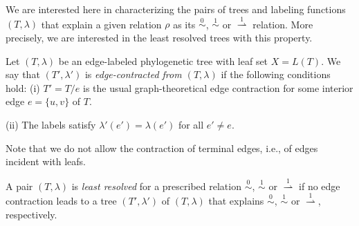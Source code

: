 \documentclass[smallextended]{svjour3}
\newcommand{\Ro}{\mathrel{\overset{0}{\sim}}}
\newcommand{\Rl}{\mathrel{\overset{1}{\sim}}}
\newcommand{\Rld}{\mathrel{\overset{1}{\rightharpoonup}}}
\begin{document}
We are interested here in characterizing the pairs of trees and labeling
functions $(T,\lambda)$ that explain a given relation $\rho$ as its $\Ro$,
$\Rl$ or $\Rld$ relation. More precisely, we are interested in the least
resolved trees with this property.

\begin{definition} 
  Let $(T,\lambda)$ be an edge-labeled phylogenetic tree with leaf set
  $X=L(T)$. We say that $(T',\lambda')$ is \emph{edge-contracted from
  $(T,\lambda)$} if the following conditions hold: (i) $T'=T/e$ is the
  usual graph-theoretical edge contraction for some interior edge
  $e=\{u,v\}$ of $T$.
  
  \noindent (ii) The labels satisfy $\lambda'(e')=\lambda(e')$ for
  all $e'\ne e$.
\end{definition} 
Note that we do not allow the contraction of terminal edges, i.e., of edges
incident with leafs. 

\begin{definition}
  A pair $(T,\lambda)$ is \emph{least resolved} for a prescribed relation
  $\Ro$, $\Rl$ or $\Rld$ if no edge contraction leads to a tree
  $(T',\lambda')$ of $(T,\lambda)$ that explains $\Ro$, $\Rl$ or $\Rld$,
  respectively.
\end{definition}
\end{document}

